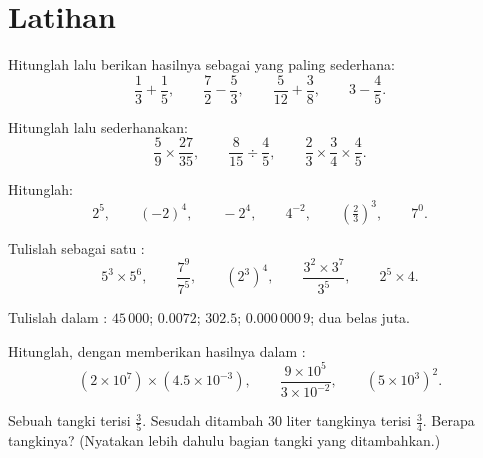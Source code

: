 \section{Latihan}

\begin{exercise}[$\star$]\label{exo:g9:fractions:1}
Hitunglah lalu berikan hasilnya sebagai  yang paling sederhana:
\[
\frac13 + \frac15, \qquad
\frac72 - \frac53, \qquad
\frac{5}{12} + \frac38, \qquad
3 - \frac45 .
\]
\end{exercise}

\begin{exercise}[$\star$]\label{exo:g9:fractions:2}
Hitunglah lalu sederhanakan:
\[
\frac59 \times \frac{27}{35}, \qquad
\frac{8}{15} \div \frac{4}{5}, \qquad
\frac23 \times \frac34 \times \frac45 .
\]
\end{exercise}

\begin{exercise}[$\star$]\label{exo:g9:fractions:3}
Hitunglah:
\[
2^5, \qquad (-2)^4, \qquad -2^4, \qquad 4^{-2}, \qquad
\left(\tfrac23\right)^3, \qquad 7^0 .
\]
\end{exercise}

\begin{exercise}[$\star$]\label{exo:g9:fractions:4}
Tulislah sebagai satu :
\[
5^3 \times 5^6, \qquad
\frac{7^9}{7^5}, \qquad
\left(2^3\right)^4, \qquad
\frac{3^2 \times 3^7}{3^5}, \qquad
2^5 \times 4 .
\]
\end{exercise}

\begin{exercise}[$\star$]\label{exo:g9:fractions:5}
Tulislah dalam : $45\,000$; $0.0072$; $302.5$;
$0.000\,000\,9$; dua belas juta.
\end{exercise}

\begin{exercise}[$\star\star$]\label{exo:g9:fractions:6}
Hitunglah, dengan memberikan hasilnya dalam :
\[
(2 \times 10^7) \times (4.5 \times 10^{-3}),
\qquad
\frac{9 \times 10^5}{3 \times 10^{-2}},
\qquad
(5 \times 10^3)^2 .
\]
\end{exercise}

\begin{exercise}[$\star\star$]\label{exo:g9:fractions:7}
Sebuah tangki terisi $\frac35$. Sesudah ditambah $30$ liter tangkinya
terisi $\frac34$. Berapa  tangkinya? (Nyatakan lebih
dahulu bagian tangki yang ditambahkan.)
\end{exercise}

